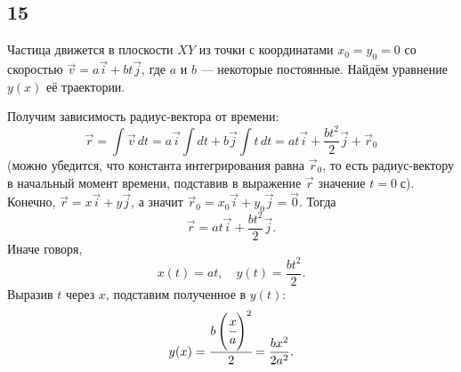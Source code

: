 \subsection{15}

Частица движется в плоскости $XY$ из точки с координатами $x_0=y_0=0$ со скоростью $\vec v=a\vec i+bt\vec j$, где $a$ и $b$ --- некоторые постоянные. Найдём уравнение $y(x)$ её траектории.

Получим зависимость радиус-вектора от времени:
\[
\vec r=\int\vec v\,dt=a\vec i\int dt+b\vec j\int t\,dt=at\vec i+\frac{bt^2}{2}\vec j+\vec r_0
\]
(можно убедится, что константа интегрирования равна $\vec r_0$, то есть радиус-вектору в начальный момент времени, подставив в выражение $\vec r$ значение $t=0\;\text{с}$). Конечно, $\vec r=x\vec i+y\vec j$, а значит $\vec r_0=x_0\vec i+y_0\vec j=\vec0$. Тогда
\[
\vec r=at\vec i+\frac{bt^2}{2}\vec j.
\]
Иначе говоря,
\[
x(t)=at,\quad y(t)=\frac{bt^2}{2}.
\]
Выразив $t$ через $x$, подставим полученное в $y(t)$:
\[
y(x)=\cfrac{b\left(\cfrac{x}{a}\right)^2}{2}=\frac{bx^2}{2a^2}.
\]